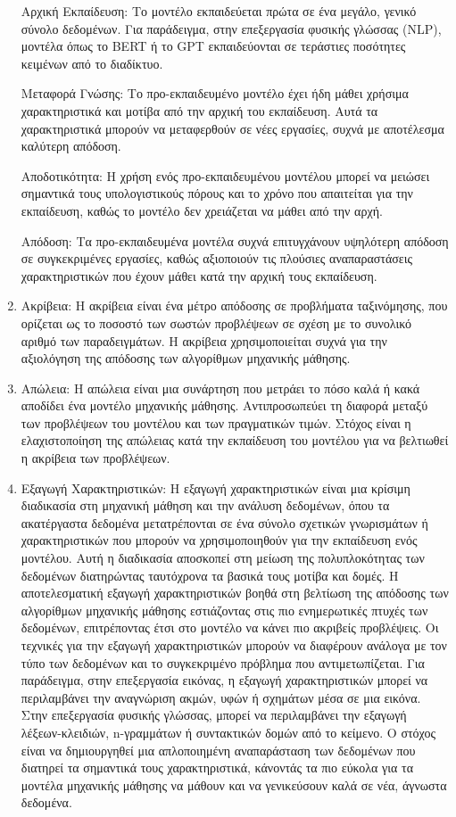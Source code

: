 \begin{enumerate}
    Αρχική Εκπαίδευση: Το μοντέλο εκπαιδεύεται πρώτα σε ένα μεγάλο, γενικό σύνολο δεδομένων. Για παράδειγμα, στην επεξεργασία φυσικής γλώσσας (NLP), μοντέλα όπως το BERT ή το GPT εκπαιδεύονται σε τεράστιες ποσότητες κειμένων από το διαδίκτυο.
    
    Μεταφορά Γνώσης: Το προ-εκπαιδευμένο μοντέλο έχει ήδη μάθει χρήσιμα χαρακτηριστικά και μοτίβα από την αρχική του εκπαίδευση. Αυτά τα χαρακτηριστικά μπορούν να μεταφερθούν σε νέες εργασίες, συχνά με αποτέλεσμα καλύτερη απόδοση.
    
    Αποδοτικότητα: Η χρήση ενός προ-εκπαιδευμένου μοντέλου μπορεί να μειώσει σημαντικά τους υπολογιστικούς πόρους και το χρόνο που απαιτείται για την εκπαίδευση, καθώς το μοντέλο δεν χρειάζεται να μάθει από την αρχή.
    
    Απόδοση: Τα προ-εκπαιδευμένα μοντέλα συχνά επιτυγχάνουν υψηλότερη απόδοση σε συγκεκριμένες εργασίες, καθώς αξιοποιούν τις πλούσιες αναπαραστάσεις χαρακτηριστικών που έχουν μάθει κατά την αρχική τους εκπαίδευση.

    \item Ακρίβεια: Η ακρίβεια είναι ένα μέτρο απόδοσης σε προβλήματα ταξινόμησης, που ορίζεται ως το ποσοστό των σωστών προβλέψεων σε σχέση με το συνολικό αριθμό των παραδειγμάτων. Η ακρίβεια χρησιμοποιείται συχνά για την αξιολόγηση της απόδοσης των αλγορίθμων μηχανικής μάθησης. 

    \item Απώλεια: Η απώλεια είναι μια συνάρτηση που μετράει το πόσο καλά ή κακά αποδίδει ένα μοντέλο μηχανικής μάθησης. Αντιπροσωπεύει τη διαφορά μεταξύ των προβλέψεων του μοντέλου και των πραγματικών τιμών. Στόχος είναι η ελαχιστοποίηση της απώλειας κατά την εκπαίδευση του μοντέλου για να βελτιωθεί η ακρίβεια των προβλέψεων. 

    \item Εξαγωγή Χαρακτηριστικών: Η εξαγωγή χαρακτηριστικών είναι μια κρίσιμη διαδικασία στη μηχανική μάθηση και την ανάλυση δεδομένων, όπου τα ακατέργαστα δεδομένα μετατρέπονται σε ένα σύνολο σχετικών γνωρισμάτων ή χαρακτηριστικών που μπορούν να χρησιμοποιηθούν για την εκπαίδευση ενός μοντέλου. Αυτή η διαδικασία αποσκοπεί στη μείωση της πολυπλοκότητας των δεδομένων διατηρώντας ταυτόχρονα τα βασικά τους μοτίβα και δομές. Η αποτελεσματική εξαγωγή χαρακτηριστικών βοηθά στη βελτίωση της απόδοσης των αλγορίθμων μηχανικής μάθησης εστιάζοντας στις πιο ενημερωτικές πτυχές των δεδομένων, επιτρέποντας έτσι στο μοντέλο να κάνει πιο ακριβείς προβλέψεις. Οι τεχνικές για την εξαγωγή χαρακτηριστικών μπορούν να διαφέρουν ανάλογα με τον τύπο των δεδομένων και το συγκεκριμένο πρόβλημα που αντιμετωπίζεται. Για παράδειγμα, στην επεξεργασία εικόνας, η εξαγωγή χαρακτηριστικών μπορεί να περιλαμβάνει την αναγνώριση ακμών, υφών ή σχημάτων μέσα σε μια εικόνα. Στην επεξεργασία φυσικής γλώσσας, μπορεί να περιλαμβάνει την εξαγωγή λέξεων-κλειδιών, n-γραμμάτων ή συντακτικών δομών από το κείμενο. Ο στόχος είναι να δημιουργηθεί μια απλοποιημένη αναπαράσταση των δεδομένων που διατηρεί τα σημαντικά τους χαρακτηριστικά, κάνοντάς τα πιο εύκολα για τα μοντέλα μηχανικής μάθησης να μάθουν και να γενικεύσουν καλά σε νέα, άγνωστα δεδομένα.


\end{enumerate}
